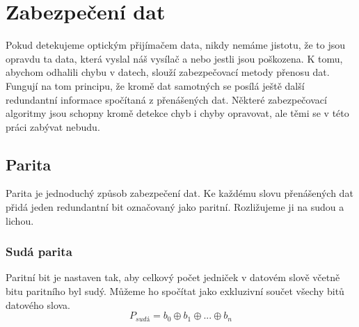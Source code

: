 \section{Zabezpečení dat}
Pokud detekujeme optickým přijímačem data, nikdy nemáme jistotu, že to jsou opravdu ta data, která vyslal náš vysílač a nebo jestli jsou poškozena. K tomu, abychom odhalili chybu v datech, slouží zabezpečovací metody přenosu dat. Fungují na tom principu, že kromě dat samotných se posílá ještě další redundantní informace spočítaná z přenášených dat. Některé zabezpečovací algoritmy jsou schopny kromě detekce chyb i chyby opravovat, ale těmi se v této práci zabývat nebudu.

\subsection{Parita}
Parita je jednoduchý způsob zabezpečení dat. Ke každému slovu přenášených dat přidá jeden redundantní bit označovaný jako paritní. Rozližujeme ji na sudou a lichou.

\subsubsection{Sudá parita}
Paritní bit je nastaven tak, aby celkový počet jedniček v datovém slově včetně bitu paritního byl sudý. Můžeme ho spočítat jako exkluzivní součet všechy bitů datového slova.
$$ P_{sudá} = b_0 \oplus b_1 \oplus ... \oplus b_n $$

